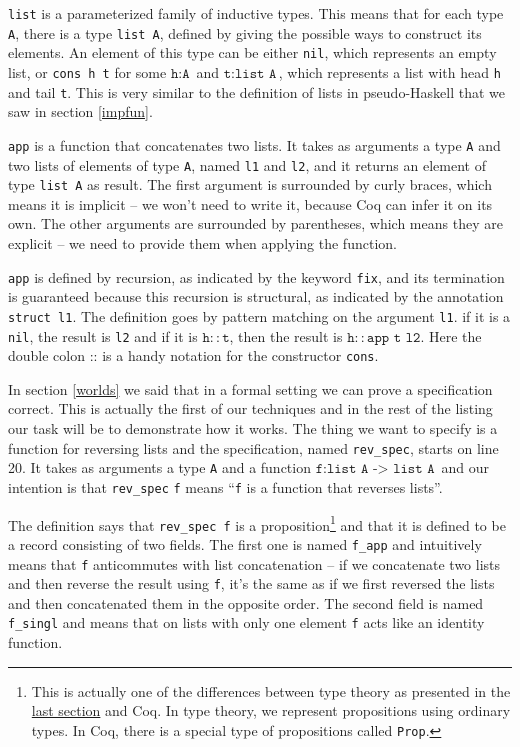 \documentclass[declaration,mgr,english,shortabstract]{iithesis}
\newcommand{\m}[1]{\texttt{#1}}
\begin{document}
\m{list} is a parameterized family of inductive types. This means that for each type \m{A}, there is a type \m{list A}, defined by giving the possible ways to construct its elements. An element of this type can be either \m{nil}, which represents an empty list, or \m{cons h t} for some $\m{h} : \m{A}$ and $\m{t} : \m{list A}$, which represents a list with head \m{h} and tail \m{t}. This is very similar to the definition of lists in pseudo-Haskell that we saw in section \ref{impfun}.

\m{app} is a function that concatenates two lists. It takes as arguments a type \m{A} and two lists of elements of type \m{A}, named \m{l1} and \m{l2}, and it returns an element of type \m{list A} as result. The first argument is surrounded by curly braces, which means it is implicit -- we won't need to write it, because Coq can infer it on its own. The other arguments are surrounded by parentheses, which means they are explicit -- we need to provide them when applying the function.

\m{app} is defined by recursion, as indicated by the keyword \m{fix}, and its termination is guaranteed because this recursion is structural, as indicated by the annotation \m{struct l1}. The definition goes by pattern matching on the argument \m{l1}. if it is a \m{nil}, the result is \m{l2} and if it is $\m{h} :: \m{t}$, then the result is $\m{h} :: \m{app t l2}$. Here the double colon $\m{::}$ is a handy notation for the constructor \m{cons}.

In section \ref{worlds} we said that in a formal setting we can prove a specification correct. This is actually the first of our techniques and in the rest of the listing our task will be to demonstrate how it works. The thing we want to specify is a function for reversing lists and the specification, named \m{rev\_spec}, starts on line 20. It takes as arguments a type \m{A} and a function $\m{f} : \m{list A -> list A}$ and our intention is that \m{rev\_spec} \m{f} means ``\m{f} is a function that reverses lists''.

The definition says that \m{rev\_spec f} is a proposition\footnote{This is actually one of the differences between type theory as presented in the \hyperref[mltt]{last section} and Coq. In type theory, we represent propositions using ordinary types. In Coq, there is a special type of propositions called \m{Prop}.} and that it is defined to be a record consisting of two fields. The first one is named \m{f\_app} and intuitively means that \m{f} anticommutes with list concatenation -- if we concatenate two lists and then reverse the result using \m{f}, it's the same as if we first reversed the lists and then concatenated them in the opposite order. The second field is named \m{f\_singl} and means that on lists with only one element \m{f} acts like an identity function.
\end{document}
